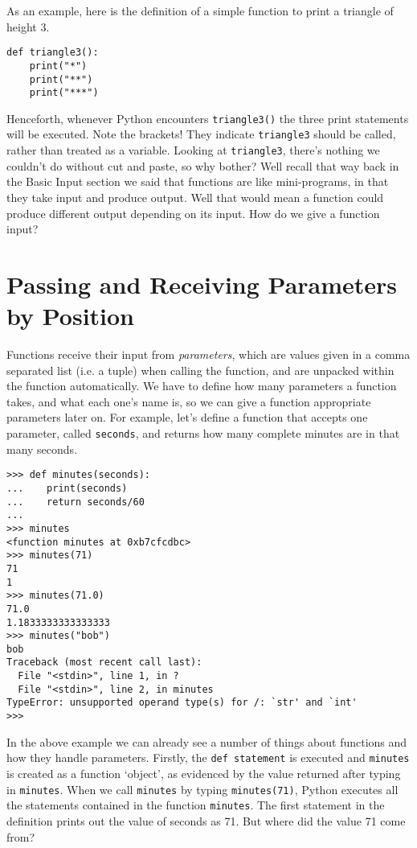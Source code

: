 As an example, here is the definition of a simple function to print   a triangle of height 3.
\begin{lstlisting}
def triangle3():
    print("*")
    print("**")
    print("***")
\end{lstlisting}

Henceforth, whenever Python encounters 
\texttt{triangle3()} the   three print statements will be executed. Note the brackets! They   indicate \texttt{triangle3} should be called, rather than treated as a variable.   Looking at \texttt{triangle3}, there's nothing we couldn't do without cut   and paste, so why bother? Well recall that way back in the Basic Input   section we said that functions are like mini-programs, in that they   take input and produce output. Well that would mean a function could   produce different output depending on its input. How do we give a   function input?

\section{Passing and Receiving Parameters by Position}

Functions receive their input from \textit{parameters}, which are values   given in a comma separated list (i.e. a tuple) when calling the   function, and are unpacked within the function automatically. We have   to define how many parameters a function takes, and what each one's   name is, so we can give a function appropriate parameters later   on. For example, let's define a function that accepts one parameter,   called \texttt{seconds}, and returns how many complete minutes are in that many   seconds.
\begin{lstlisting}
>>> def minutes(seconds):
...    print(seconds)
...    return seconds/60
...
>>> minutes
<function minutes at 0xb7cfcdbc>
>>> minutes(71)
71
1
>>> minutes(71.0)
71.0
1.1833333333333333
>>> minutes("bob")
bob
Traceback (most recent call last):
  File "<stdin>", line 1, in ?
  File "<stdin>", line 2, in minutes
TypeError: unsupported operand type(s) for /: `str' and `int'
>>>
\end{lstlisting}

In the above example we can already see a number of things about   functions and how they handle parameters. Firstly, the \texttt{def statement}   is executed and \texttt{minutes} is created as a function `object', as   evidenced by the value returned after typing in \texttt{minutes}. When we call \texttt{minutes} by typing \texttt{minutes(71)}, Python   executes all the statements contained in the function \texttt{minutes}.   The first statement in the definition prints out the value of seconds   as 71. But where did the value 71 come from?

